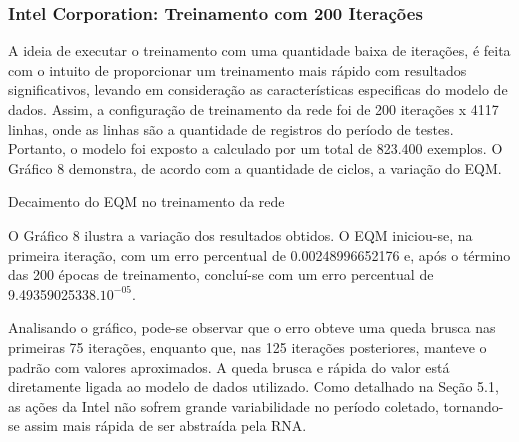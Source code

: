 \subsubsection{Intel Corporation: Treinamento com 200 Iterações}	
A ideia de executar o treinamento com uma quantidade baixa de iterações, é feita com o intuito de proporcionar um treinamento mais rápido com resultados significativos, levando em consideração as características especificas do modelo de dados. Assim, a configuração de treinamento da rede foi de 200 iterações x 4117 linhas, onde as linhas são a quantidade de registros do período de testes. Portanto, o modelo foi exposto a calculado por um total de 823.400 exemplos. O Gráfico 8 demonstra, de acordo com a quantidade de ciclos, a variação do EQM.
\begin{grafico}[h]
	\centering
	\caption{Decaimento do EQM no treinamento da rede}
	\label{lingua}
\end{grafico}

O Gráfico 8 ilustra a variação dos resultados obtidos. O EQM iniciou-se, na primeira iteração, com um erro percentual de 0.00248996652176 e, após o término das 200 épocas de treinamento, concluí-se com um erro percentual de 9.49359025338.$10^{-05}$.

Analisando o gráfico, pode-se observar que o erro obteve uma queda brusca nas primeiras 75 iterações, enquanto que, nas 125 iterações posteriores, manteve o padrão com valores aproximados. A queda brusca e rápida do valor está diretamente ligada ao modelo de dados utilizado. Como detalhado na Seção 5.1, as ações da Intel não sofrem grande variabilidade no período coletado, tornando-se assim mais rápida de ser abstraída pela RNA.


